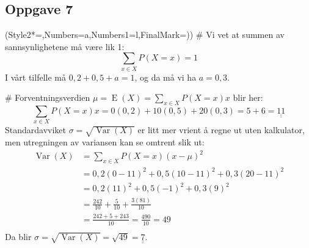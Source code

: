 \documentclass[12pt, a4paper]
{article}						%
\def\answer#1{\underline{\underline{#1}}}
\begin{document}
\subsection*{Oppgave 7}
\begin{easylist}[enumerate]
	\ListProperties(Style2*=,Numbers=a,Numbers1=l,FinalMark={)})
	# Vi vet at summen av sannsynlighetene må være lik 1:
	\begin{equation*}
		\sum_{x \in X} P(X= x) = 1
	\end{equation*}
	I vårt tilfelle må $0,2 + 0,5 + a = 1$, og da må vi ha \answer{$a = 0,3$}.
	
	# Forventningsverdien $\mu = \operatorname{E}(X) = \sum_{x \in X} P(X =x)x$ blir her:
	\begin{equation*}
	\sum_{x \in X} P(X =x)x = 0 (0,2) + 10 (0,5) + 20 (0,3) = 5 + 6 = \answer{11}
	\end{equation*}
	Standardavviket $\sigma = \sqrt{\operatorname{Var}(X)}$ er litt mer vrient å regne ut uten kalkulator, men utregningen av variansen kan se omtrent slik ut:
	\begin{align*}
	\operatorname{Var}(X) &= \sum_{x \in X} P(X =x)(x - \mu)^2 \\
	&= 0,2(0-11)^2 + 0,5(10-11)^2 +  0,3(20-11)^2 \\
	&= 0,2(11)^2 + 0,5(-1)^2 +  0,3(9)^2 \\
	&= \frac{242}{10} + \frac{5}{10} +  \frac{3(81)}{10} \\
	&= \frac{242+5+243}{10} = \frac{490}{10} = 49 \\
	\end{align*}
	Da blir $\sigma = \sqrt{\operatorname{Var}(X)} = \sqrt{49} = \answer{7}$.
\end{easylist}
\end{document}
